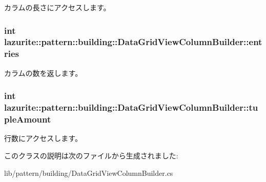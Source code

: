 カラムの長さにアクセスします。 \hypertarget{classlazurite_1_1pattern_1_1building_1_1_data_grid_view_column_builder_a8f3dd634d9e186fdf25e27677a1502a3}{
\subsubsection[{entries}]{\setlength{\rightskip}{0pt plus 5cm}int lazurite::pattern::building::DataGridViewColumnBuilder::entries}}
\label{classlazurite_1_1pattern_1_1building_1_1_data_grid_view_column_builder_a8f3dd634d9e186fdf25e27677a1502a3}


カラムの数を返します。 \hypertarget{classlazurite_1_1pattern_1_1building_1_1_data_grid_view_column_builder_a2fe5c2e6cc6915ece3cc97855a761c12}{
\subsubsection[{tupleAmount}]{\setlength{\rightskip}{0pt plus 5cm}int lazurite::pattern::building::DataGridViewColumnBuilder::tupleAmount}}
\label{classlazurite_1_1pattern_1_1building_1_1_data_grid_view_column_builder_a2fe5c2e6cc6915ece3cc97855a761c12}


行数にアクセスします。 

このクラスの説明は次のファイルから生成されました:\begin{DoxyCompactItemize}
\item 
lib/pattern/building/DataGridViewColumnBuilder.cs\end{DoxyCompactItemize}

